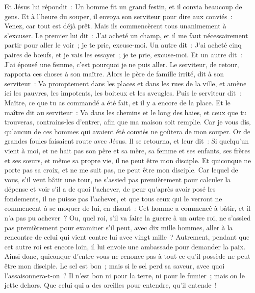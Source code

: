 \begin{multicols}{2}
Et Jésus lui répondit~: Un homme fit un grand festin, et il convia beaucoup de gens.
Et à l'heure du souper, il envoya son serviteur pour dire aux conviés~: Venez, car tout est déjà prêt.
Mais ils commencèrent tous unanimement à s'excuser. Le premier lui dit~: J'ai acheté un champ, et il me faut nécessairement partir pour aller le voir~; je te prie, excuse-moi.
Un autre dit~: J'ai acheté cinq paires de bœufs, et je vais les essayer~; je te prie, excuse-moi.
Et un autre dit~: J'ai épousé une femme, c'est pourquoi je ne puis aller.
Le serviteur, de retour, rapporta ces choses à son maître. Alors le père de famille irrité, dit à son serviteur~: Va promptement dans les places et dans les rues de la ville, et amène ici les pauvres, les impotents, les boiteux et les aveugles.
Puis le serviteur dit~: Maître, ce que tu as commandé a été fait, et il y a encore de la place.
Et le maître dit au serviteur~: Va dans les chemins et le long des haies, et ceux que tu trouveras, contrains-les d'entrer, afin que ma maison soit remplie.
Car je vous dis, qu'aucun de ces hommes qui avaient été conviés ne goûtera de mon souper.
Or de grandes foules faisaient route avec Jésus. Il se retourna, et leur dit~:
Si quelqu'un vient à moi, et ne hait pas son père et sa mère, sa femme et ses enfants, ses frères et ses sœurs, et même sa propre vie, il ne peut être mon disciple.
Et quiconque ne porte pas sa croix, et ne me suit pas, ne peut être mon disciple.
Car lequel de vous, s'il veut bâtir une tour, ne s'assied pas premièrement pour calculer la dépense et voir s'il a de quoi l'achever,
de peur qu'après avoir posé les fondements, il ne puisse pas l'achever, et que tous ceux qui le verront ne commencent à se moquer de lui,
en disant~: Cet homme a commencé à bâtir, et il n'a pas pu achever~?
Ou, quel roi, s'il va faire la guerre à un autre roi, ne s'assied pas premièrement pour examiner s'il peut, avec dix mille hommes, aller à la rencontre de celui qui vient contre lui avec vingt mille~?
Autrement, pendant que cet autre roi est encore loin, il lui envoie une ambassade pour demander la paix.
Ainsi donc, quiconque d'entre vous ne renonce pas à tout ce qu'il possède ne peut être mon disciple.
Le sel est bon~; mais si le sel perd sa saveur, avec quoi l'assaisonnera-t-on~?
Il n'est bon ni pour la terre, ni pour le fumier~; mais on le jette dehors. Que celui qui a des oreilles pour entendre, qu'il entende~!

\end{multicols}
